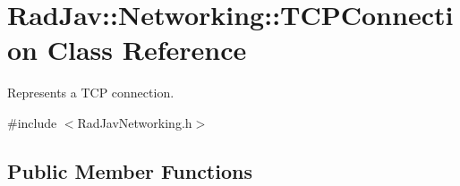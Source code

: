 \hypertarget{class_rad_jav_1_1_networking_1_1_t_c_p_connection}{}\section{Rad\+Jav\+:\+:Networking\+:\+:T\+C\+P\+Connection Class Reference}
\label{class_rad_jav_1_1_networking_1_1_t_c_p_connection}


Represents a T\+CP connection.  




{\ttfamily \#include $<$Rad\+Jav\+Networking.\+h$>$}

\subsection*{Public Member Functions}
